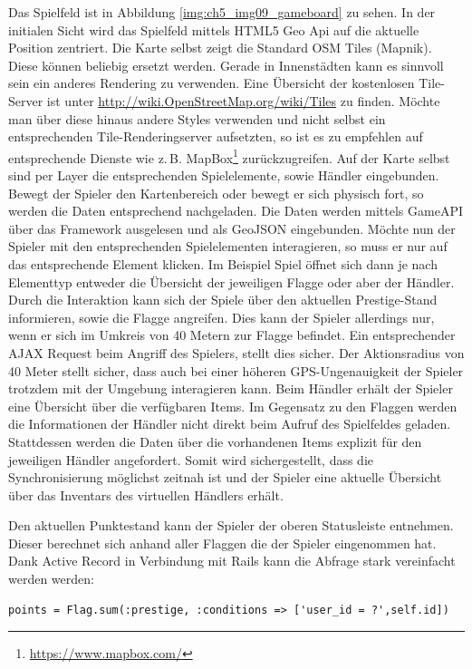 Das Spielfeld ist in Abbildung \ref{img:ch5_img09_gameboard} zu sehen. In der initialen Sicht wird das Spielfeld mittels HTML5 Geo Api auf die aktuelle Position zentriert. Die Karte selbst zeigt die Standard OSM Tiles (Mapnik). Diese können beliebig ersetzt werden. Gerade in Innenstädten kann es sinnvoll sein ein anderes Rendering zu verwenden. Eine Übersicht der kostenlosen Tile-Server ist unter \url{http://wiki.OpenStreetMap.org/wiki/Tiles} zu finden. Möchte man über diese hinaus andere Styles verwenden und nicht selbst ein entsprechenden Tile-Renderingserver aufsetzten, so ist es zu empfehlen auf entsprechende Dienste wie z.\,B. MapBox\footnote{\url{https://www.mapbox.com/}} zurückzugreifen. Auf der Karte selbst sind per Layer die entsprechenden Spielelemente, sowie Händler eingebunden.
Bewegt der Spieler den Kartenbereich oder bewegt er sich physisch fort, so werden die Daten entsprechend nachgeladen. Die Daten werden mittels GameAPI über das Framework ausgelesen und als GeoJSON eingebunden. Möchte nun der Spieler mit den entsprechenden Spielelementen interagieren, so muss er nur auf das entsprechende Element klicken. Im Beispiel Spiel öffnet sich dann je nach Elementtyp entweder die Übersicht der jeweiligen Flagge oder aber der Händler. Durch die Interaktion kann sich der Spiele über den aktuellen Prestige-Stand informieren, sowie die Flagge angreifen. Dies kann der Spieler allerdings nur, wenn er sich im Umkreis von 40 Metern zur Flagge befindet. Ein entsprechender AJAX Request beim Angriff des Spielers, stellt dies sicher. Der Aktionsradius von 40 Meter stellt sicher, dass auch bei einer höheren GPS-Ungenauigkeit der Spieler trotzdem mit der Umgebung interagieren kann.
Beim Händler erhält der Spieler eine Übersicht über die verfügbaren Items. Im Gegensatz zu den Flaggen werden die Informationen der Händler nicht direkt beim Aufruf des Spielfeldes geladen. Stattdessen werden die Daten über die vorhandenen Items explizit für den jeweiligen Händler angefordert. Somit wird sichergestellt, dass die Synchronisierung möglichst zeitnah ist und der Spieler eine aktuelle Übersicht über das Inventars des virtuellen Händlers erhält.

Den aktuellen Punktestand kann der Spieler der oberen Statusleiste entnehmen. Dieser berechnet sich anhand aller Flaggen die der Spieler eingenommen hat. Dank Active Record in Verbindung mit Rails kann die Abfrage stark vereinfacht werden werden:
\\
\lstset{
   language=Ruby
}

\begin{lstlisting}[caption=Ruby - Abfrage der Spielerpunkte, label=code:ch5:activerecord01]
points = Flag.sum(:prestige, :conditions => ['user_id = ?',self.id])
\end{lstlisting}

